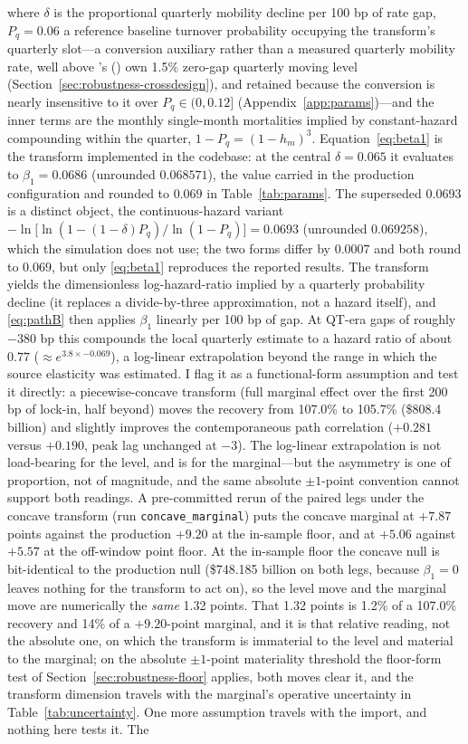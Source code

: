 \documentclass[12pt]{article}
\newcommand{\citepos}[1]{\citeauthor{#1}'s (\citeyear{#1})}
\begin{document}
where $\delta$ is the proportional quarterly mobility decline per 100 bp of rate gap, $P_q = 0.06$ a reference baseline turnover probability occupying the transform's quarterly slot---a conversion auxiliary rather than a measured quarterly mobility rate, well above \citepos{liebersohn2024} own 1.5\% zero-gap quarterly moving level (Section~\ref{sec:robustness-crossdesign}), and retained because the conversion is nearly insensitive to it over $P_q \in (0, 0.12]$ (Appendix~\ref{app:params})---and the inner terms are the monthly single-month mortalities implied by constant-hazard compounding within the quarter, $1 - P_q = (1 - h_m)^3$. Equation~\eqref{eq:beta1} is the transform implemented in the codebase: at the central $\delta = 0.065$ it evaluates to $\beta_1 = 0.0686$ (unrounded $0.068571$), the value carried in the production configuration and rounded to $0.069$ in Table~\ref{tab:params}. The superseded $0.0693$ is a distinct object, the continuous-hazard variant $-\ln\!\big[\ln(1-(1-\delta)P_q)/\ln(1-P_q)\big] = 0.0693$ (unrounded $0.069258$), which the simulation does not use; the two forms differ by $0.0007$ and both round to $0.069$, but only \eqref{eq:beta1} reproduces the reported results. The transform yields the dimensionless log-hazard-ratio implied by a quarterly probability decline (it replaces a divide-by-three approximation, not a hazard itself), and \eqref{eq:pathB} then applies $\beta_1$ linearly per 100 bp of gap. At QT-era gaps of roughly $-380$ bp this compounds the local quarterly estimate to a hazard ratio of about $0.77$ ($\approx e^{3.8 \times -0.069}$), a log-linear extrapolation beyond the range in which the source elasticity was estimated. I flag it as a functional-form assumption and test it directly: a piecewise-concave transform (full marginal effect over the first 200 bp of lock-in, half beyond) moves the recovery from 107.0\% to 105.7\% (\$808.4 billion) and slightly improves the contemporaneous path correlation ($+0.281$ versus $+0.190$, peak lag unchanged at $-3$). The log-linear extrapolation is not load-bearing for the level, and is for the marginal---but the asymmetry is one of proportion, not of magnitude, and the same absolute $\pm 1$-point convention cannot support both readings. A pre-committed rerun of the paired legs under the concave transform (run \texttt{concave\_marginal}) puts the concave marginal at $+7.87$ points against the production $+9.20$ at the in-sample floor, and at $+5.06$ against $+5.57$ at the off-window point floor. At the in-sample floor the concave null is bit-identical to the production null (\$748.185 billion on both legs, because $\beta_1 = 0$ leaves nothing for the transform to act on), so the level move and the marginal move are numerically the \emph{same} 1.32 points. That 1.32 points is 1.2\% of a 107.0\% recovery and 14\% of a $+9.20$-point marginal, and it is that relative reading, not the absolute one, on which the transform is immaterial to the level and material to the marginal; on the absolute $\pm 1$-point materiality threshold the floor-form test of Section~\ref{sec:robustness-floor} applies, both moves clear it, and the transform dimension travels with the marginal's operative uncertainty in Table~\ref{tab:uncertainty}. One more assumption travels with the import, and nothing here tests it. The 
\end{document}

